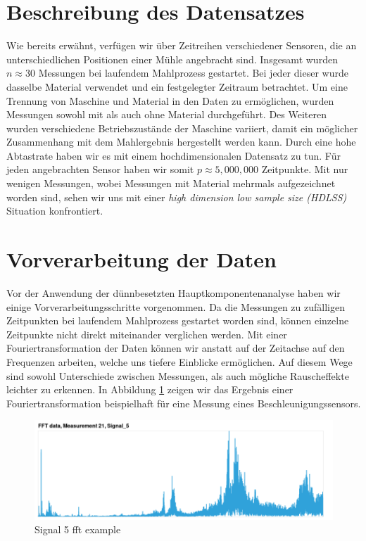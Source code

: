 \section{Beschreibung des Datensatzes}
\label{data_set}

Wie bereits erwähnt, verfügen wir über Zeitreihen verschiedener Sensoren, 
die an unterschiedlichen Positionen einer Mühle angebracht sind. Insgesamt wurden $n \approx 30$ Messungen bei laufendem Mahlprozess gestartet. Bei jeder dieser wurde dasselbe Material verwendet und ein festgelegter Zeitraum betrachtet. Um eine Trennung von Maschine und Material in den Daten zu ermöglichen, wurden Messungen sowohl mit als auch ohne Material durchgeführt. Des Weiteren wurden verschiedene Betriebszustände der Maschine variiert, damit ein möglicher Zusammenhang mit dem Mahlergebnis hergestellt werden kann. Durch eine hohe Abtastrate haben wir es mit einem hochdimensionalen Datensatz zu tun. Für jeden angebrachten Sensor haben wir somit $p \approx 5,000,000$ Zeitpunkte. Mit nur wenigen Messungen, wobei Messungen mit Material mehrmals aufgezeichnet worden sind, sehen wir uns mit einer \textit{high dimension low sample size (HDLSS)} Situation konfrontiert. 

\section{Vorverarbeitung der Daten}
\label{preprocessing}

Vor der Anwendung der dünnbesetzten Hauptkomponentenanalyse haben wir einige Vorverarbeitungsschritte vorgenommen. Da die Messungen zu zufälligen Zeitpunkten bei laufendem Mahlprozess gestartet worden sind, können einzelne Zeitpunkte nicht direkt miteinander verglichen werden. Mit einer Fouriertransformation der Daten können wir anstatt auf der Zeitachse auf den Frequenzen arbeiten, welche uns tiefere Einblicke ermöglichen. Auf diesem Wege sind sowohl Unterschiede zwischen Messungen, als auch mögliche Rauscheffekte leichter zu erkennen. In Abbildung \ref{fft_example} zeigen wir das Ergebnis einer Fouriertransformation beispielhaft für eine Messung eines Beschleunigungssensors.

\begin{figure}
\centering
\includegraphics[width=\textwidth]{figures/Signal_5_fft_example.png}
\caption{Signal 5 fft example}
\label{fft_example}
\end{figure}

